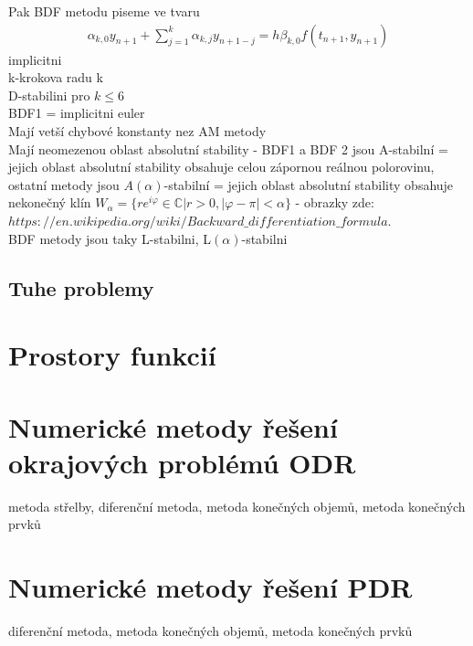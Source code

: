 Pak BDF metodu piseme ve tvaru
\begin{align}
\alpha_{k,0} y_{n+1} + \sum _{j=1}^{k}\alpha_{k,j} y_{n+1-j} = h \beta _{k,0}f(t_{n+1},y_{n+1})
\end{align}
implicitni \\
k-krokova  radu k \\
D-stabilini pro $k \leq 6$ \\
BDF1 = implicitni euler \\
Mají vetší chybové konstanty nez AM metody \\
Mají neomezenou oblast absolutní stability - BDF1 a BDF 2 jsou A-stabilní = jejich oblast absolutní stability obsahuje celou zápornou reálnou polorovinu, ostatní metody jsou $A(\alpha)$-stabilní = jejich oblast absolutní stability obsahuje nekonečný klín $W_{\alpha}=\lbrace re^{i \varphi} \in \mathbb{C} | r>0, \vert \varphi - \pi \vert < \alpha \rbrace$  - obrazky zde: $https://en.wikipedia.org/wiki/Backward\_differentiation\_formula$. \\
BDF metody jsou taky L-stabilni, L$(\alpha)$-stabilni 





\subsection{Tuhe problemy}



\section{Prostory funkcií}

\section{Numerické metody řešení okrajových problémú ODR}
metoda střelby, diferenční metoda, metoda konečných objemů, metoda konečných prvků

\section{Numerické metody řešení PDR}
diferenční metoda, metoda konečných objemů, metoda konečných prvků
